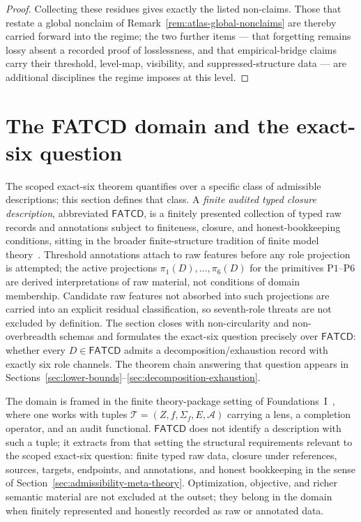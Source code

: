 \documentclass[11pt]{article}
\theoremstyle{definition}
\newcommand{\FATCD}{\ensuremath{\mathsf{FATCD}}}
\newcommand{\Pone}{\ensuremath{\mathrm{P1}}}
\newcommand{\Psix}{\ensuremath{\mathrm{P6}}}
\begin{document}
\begin{proof}
Collecting these residues gives exactly the listed non-claims. Those that
restate a global nonclaim of Remark~\ref{rem:atlas-global-nonclaims} are
thereby carried forward into the regime; the two further items --- that
forgetting remains lossy absent a recorded proof of losslessness, and that
empirical-bridge claims carry their threshold, level-map, visibility, and
suppressed-structure data --- are additional disciplines the regime imposes
at this level.
\end{proof}
 \section{The FATCD domain and the exact-six question}\label{sec:fatcd-domain}



The scoped exact-six theorem quantifies over a specific class of
admissible descriptions; this section defines that class. A
\emph{finite audited typed closure description}, abbreviated \FATCD{},
is a finitely presented collection of typed raw records and
annotations subject to finiteness, closure, and honest-bookkeeping
conditions, sitting in the broader finite-structure tradition of
finite model theory~\citep{Libkin2004}. Threshold annotations attach to raw features before any
role projection is attempted; the active projections
\(\pi_1(D),\dots,\pi_6(D)\) for the primitives \Pone{}--\Psix{} are
derived interpretations of raw material, not conditions of domain
membership. Candidate raw features not absorbed into such projections
are carried into an explicit residual classification, so seventh-role
threats are not excluded by definition. The section closes with
non-circularity and non-overbreadth schemas and formulates the
exact-six question precisely over \FATCD{}: whether every
\(D \in \FATCD{}\) admits a decomposition/exhaustion record with
exactly six role channels. The theorem chain answering that question
appears in
Sections~\ref{sec:lower-bounds}--\ref{sec:decomposition-exhaustion}.

The domain is framed in the finite theory-package setting of
Foundations~I~\citep{Tsiokos2026SixBirdsFoundations}, where one works
with tuples \(\mathcal{T} = (Z, f, \Sigma_f, E, \mathcal{A})\)
carrying a lens, a completion operator, and an audit functional. \FATCD{} does not
identify a description with such a tuple; it extracts from that
setting the structural requirements relevant to the scoped exact-six
question: finite typed raw data, closure under references, sources,
targets, endpoints, and annotations, and honest bookkeeping in the
sense of Section~\ref{sec:admissibility-meta-theory}. Optimization,
objective, and richer semantic material are not excluded at the
outset; they belong in the domain when finitely represented and
honestly recorded as raw or annotated data.
\end{document}
